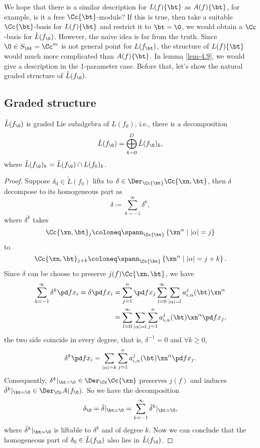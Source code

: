 We hope that there is a similar description for $L(f)\{\bt\}$ as  $A(f)\{\bt\}$, for example, is it  a free $\Cc\{\bt\}$-module? If this is true, then take a suitable $\Cc\{\bt\}$-basis for $L(f)\{\bt\}$ and restrict it to $\bt=\0$,  we would obtain a $\Cc$-basis for $\tilde L(f_\0)$. However, the naive idea is far from the truth. Since $\0 \in S_\bt= \Cc^m$ is not general point for $L(f_\bt)$, the structure of $L(f)\{\bt\}$ would much more complicated than $A(f)\{\bt\}$. In lemma \ref{lem-4.9}, we would give a description in the 1-parameter case. Before that, let's show the natural graded structure of $\tilde L(f_\0)$. 

\subsection{Graded structure}
\begin{lemma}\label{lem-4.3}
  $\tilde L(f_\0)$ is graded Lie subalgebra of $L(f_0)$, i.e., there is a decomposition
  \[\tilde L(f_\0) = \bigoplus_{k=0}^D\tilde L(f_\0)_k,\]
  where $\tilde L(f_\0)_k = \tilde L(f_\0) \cap L(f_0)_k$.
\end{lemma}
\begin{proof}
  Suppose $\delta_0\in \tilde L(f_0)$ lifts to $\delta \in \Der_{\Cc\{\bt\}} \Cc\{\xn, \bt\}$, then $\delta$ decompose to its homogeneous part as
  \[\delta\coloneq  \sum_{k=-1}^\infty \delta^k,\]
  where $\delta^k$ takes
  \[\Cc\{\xn,\bt\}_j\coloneq \spann_{\Cc\{\bt\}}\left\{ \xn^\alpha\mid |\alpha|=j\right\}\]
  to
  \[\Cc\{\xn,\bt\}_{j+k}\coloneq \spann_{\Cc\{\bt\}}\left\{ \xn^\alpha\mid |\alpha|=j+k\right\}.\]
  Since $\delta$ can be choose to preserve $j(f)\Cc\{\xn,\bt\}$, we have
  \begin{align*}
    \sum_{k=-1}^\infty \delta^k \pd f{x_i} =\delta \pd  f {x_i}
  &=\sum_{j=1}^n\pd f{x_j} \sum_{l=0}^\infty \sum_{|\alpha|=l}a_{i,\alpha}^j(\bt)\xn^\alpha\\
  &= \sum_{l=0}^\infty \sum_{|\alpha|=l}\sum_{j=1}^na_{i,\alpha}^j(\bt)\xn^\alpha \pd f{x_j},
  \end{align*}
  the two side coincide in every degree, that is, $\delta^{-1}=0$ and $\forall k\geqslant 0$,
  \[\delta^k \pd f{x_i} =
  \sum_{|\alpha|=k}\sum_{j=1}^n a_{i,\alpha}^j(\bt)\xn^\alpha \pd f{x_j}.\]
  Consequently, $\delta^k|_{\bt=\0} \in \Der_\Cc \Cc\{\xn\}$ preserves $j(f)$ and induces $\bar \delta^k|_{\bt=\0}\in \Der_\Cc A(f_\0) .$
  So we have the decomposition
  \[\delta_\0= \bar \delta|_{\bt=\0}=\sum_{k=-1}^\infty \bar \delta^k|_{\bt=\0},\]
  where $\bar \delta^k|_{\bt=\0}$ is liftable to $\delta^k$ and of degree $k$. Now we can conclude that the homogeneous part of $\delta_0\in \tilde L(f_\0)$ also lies in $\tilde L(f_\0)$.
\end{proof}
